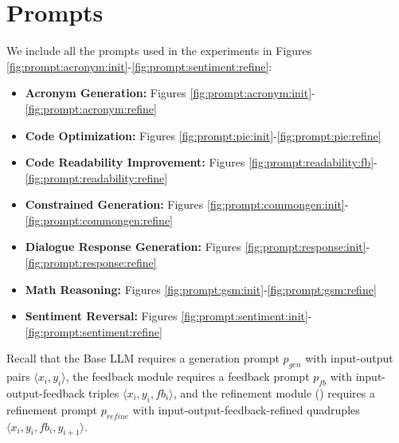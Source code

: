 \section{Prompts}
\label{sec:prompts}

We include all the prompts used in the experiments in Figures \ref{fig:prompt:acronym:init}-\ref{fig:prompt:sentiment:refine}:
\begin{itemize}
\item \textbf{Acronym Generation:} Figures \ref{fig:prompt:acronym:init}-\ref{fig:prompt:acronym:refine}
\item \textbf{Code Optimization:} Figures \ref{fig:prompt:pie:init}-\ref{fig:prompt:pie:refine}
\item \textbf{Code Readability Improvement:} Figures \ref{fig:prompt:readability:fb}-\ref{fig:prompt:readability:refine}
\item \textbf{Constrained Generation:} Figures \ref{fig:prompt:commongen:init}-\ref{fig:prompt:commongen:refine}
\item \textbf{Dialogue Response Generation:} Figures \ref{fig:prompt:response:init}-\ref{fig:prompt:response:refine}
\item \textbf{Math Reasoning:} Figures \ref{fig:prompt:gsm:init}-\ref{fig:prompt:gsm:refine}
\item \textbf{Sentiment Reversal:} Figures \ref{fig:prompt:sentiment:init}-\ref{fig:prompt:sentiment:refine}


\end{itemize}

Recall that the Base LLM requires a generation prompt $p_{gen}$ with input-output pairs $\langle x_i, y_i \rangle$, the feedback module requires a feedback prompt $p_{fb}$ with input-output-feedback triples $\langle x_i, y_i, fb_i \rangle$, and the refinement module (\itermod) requires a refinement prompt $p_{refine}$ with input-output-feedback-refined quadruples $\langle x_i, y_i, fb_i, y_{i+1} \rangle$.


